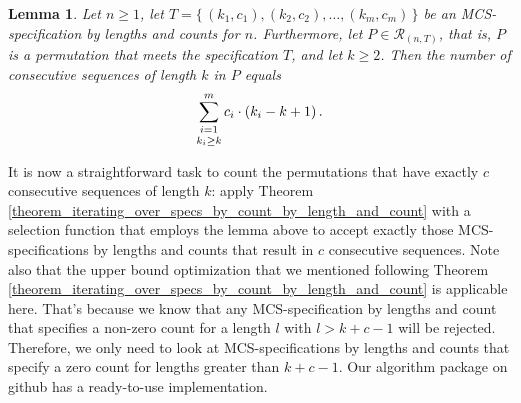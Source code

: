 \documentclass{article}
\newtheorem{lemma}[theorem]{Lemma}
\begin{document}
\begin{lemma}
  Let $n \geq 1$, let $T = \{\,(k_1, c_1), (k_2, c_2), \ldots,(k_m, c_m)\,\}$ be an
  MCS-specification by lengths and counts for $n$. Furthermore, let $P\in {\mathcal R}_{(n,T)}$,
  that is, $P$ is a permutation that meets the specification $T$, and let $k \geq 2$.
  Then the number of consecutive
  sequences of length $k$ in $P$ equals
  $$
  \sum_{\shortstack{$\scriptstyle i=1$\\$\scriptstyle k_i\geq k$}}^{m}c_i\cdot (k_i - k + 1)\,.
  $$
\end{lemma}

It is now a straightforward task to count the permutations that have exactly $c$ consecutive sequences
of length $k$: apply Theorem \ref{theorem_iterating_over_specs_by_count_by_length_and_count} with a
selection function that employs the lemma above to accept exactly those MCS-specifications by lengths
and counts that result in $c$ consecutive sequences. Note also that the upper bound optimization that
we mentioned following Theorem \ref{theorem_iterating_over_specs_by_count_by_length_and_count} is
applicable here. That's because we know that any MCS-specification by lengths and count that specifies
a non-zero count for a length $l$ with $l > k + c - 1$ will be rejected. Therefore, we only need to
look at MCS-specifications by lengths and counts that specify a zero count for lengths greater than
$k + c - 1$. Our algorithm package on github \cite{Algos} has a ready-to-use implementation.
\end{document}
